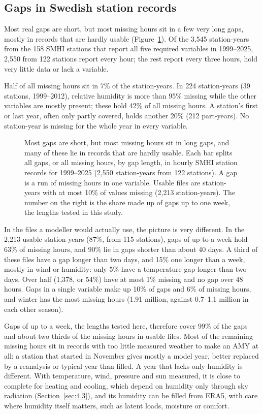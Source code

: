 \subsection{Gaps in Swedish station records}\label{sec:3.3}

Most real gaps are short, but most missing hours sit in a few very long gaps, mostly in records that are hardly usable (Figure~\ref{fig:2}). Of the 3,545 station-years from the 158 SMHI stations that report all five required variables in 1999--2025, 2,550 from 122 stations report every hour; the rest report every three hours, hold very little data or lack a variable.

Half of all missing hours sit in 7\% of the station-years. In 224 station-years (39 stations, 1999--2012), relative humidity is more than 95\% missing while the other variables are mostly present; these hold 42\% of all missing hours. A station's first or last year, often only partly covered, holds another 20\% (212 part-years). No station-year is missing for the whole year in every variable.

\begin{figure}[tbp]
\centering
{}
\caption{Most gaps are short, but most missing hours sit in long gaps, and many of these lie in records that are hardly usable. Each bar splits all gaps, or all missing hours, by gap length, in hourly SMHI station records for 1999--2025 (2,550 station-years from 122 stations). A gap is a run of missing hours in one variable. Usable files are station-years with at most 10\% of values missing (2,213 station-years). The number on the right is the share made up of gaps up to one week, the lengths tested in this study.}
\label{fig:2}
\end{figure}

In the files a modeller would actually use, the picture is very different. In the 2,213 usable station-years (87\%, from 115 stations), gaps of up to a week hold 63\% of missing hours, and 90\% lie in gaps shorter than about 40 days. A third of these files have a gap longer than two days, and 15\% one longer than a week, mostly in wind or humidity: only 5\% have a temperature gap longer than two days. Over half (1,378, or 54\%) have at most 1\% missing and no gap over 48 hours. Gaps in a single variable make up 10\% of gaps and 6\% of missing hours, and winter has the most missing hours (1.91 million, against 0.7--1.1 million in each other season).

Gaps of up to a week, the lengths tested here, therefore cover 99\% of the gaps and about two thirds of the missing hours in usable files. Most of the remaining missing hours sit in records with too little measured weather to make an AMY at all: a station that started in November gives mostly a model year, better replaced by a reanalysis or typical year than filled. A year that lacks only humidity is different. With temperature, wind, pressure and sun measured, it is close to complete for heating and cooling, which depend on humidity only through sky radiation (Section~\ref{sec:4.3}), and its humidity can be filled from ERA5, with care where humidity itself matters, such as latent loads, moisture or comfort.

